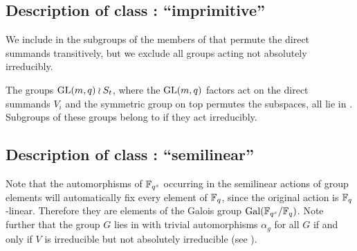 \subsection{Description of class : ``imprimitive''}
\label{descC2}


We include in  the subgroups of the members of  that
permute the direct summands transitively, but we exclude all groups
acting not absolutely irreducibly.

\smallskip
\exmemb
The groups $\GL(m,q) \wr S_t$, where the $\GL(m,q)$ factors act on
the direct summands $V_i$ and the symmetric group on top permutes the
subspaces, all lie in . Subgroups of these groups belong to 
if they act irreducibly.


\subsection{Description of class : ``semilinear''}
\label{descC3}


Note that the automorphisms of $\mathbb{F}_{q^s}$ occurring in the semilinear
actions of group elements will automatically fix every element of $\mathbb{F}_q$, 
since the original action is $\mathbb{F}_q$-linear. Therefore they are elements of
the Galois group $\Gal(\F_{q^s}/\F_q)$. Note further that
the group $G$ lies in  
with trivial automorphisms $\alpha_g$ for all $G$ if and only if
$V$ is irreducible but not absolutely irreducible (see \cite[(29.13)]{CR0}).

